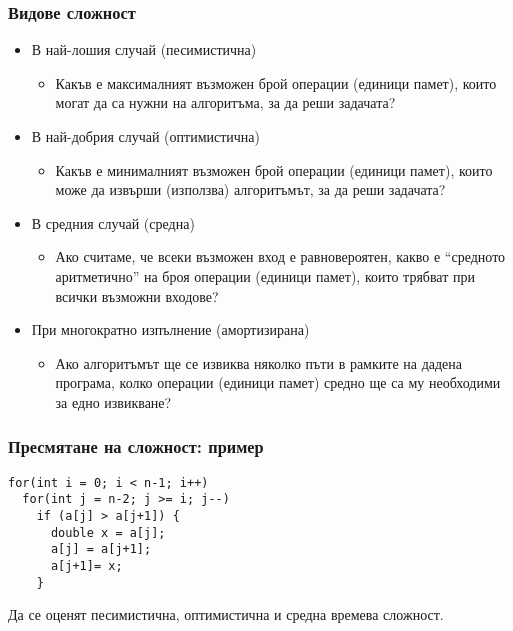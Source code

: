 \documentclass{beamer}
\begin{document}
\begin{frame}
  \frametitle{Видове сложност}

  \begin{itemize}[<+->]
  \item В най-лошия случай (песимистична)
    \begin{itemize}
    \item Какъв е максималният възможен брой операции (единици памет), които могат да са нужни на алгоритъма, за да реши задачата?
    \end{itemize}

  \item В най-добрия случай (оптимистична)
    \begin{itemize}
    \item Какъв е минималният възможен брой операции (единици памет), които може да извърши (използва) алгоритъмът, за да реши задачата?
    \end{itemize}

  \item В средния случай (средна)
    \begin{itemize}
    \item Ако считаме, че всеки възможен вход е равновероятен, какво е ``средното аритметично'' на броя операции (единици памет), които трябват при всички възможни входове?
    \end{itemize}

  \item При многократно изпълнение (амортизирана)
    \begin{itemize}
    \item Ако алгоритъмът ще се извиква няколко пъти в рамките на дадена програма, колко операции (единици памет) средно ще са му необходими за едно извикване?
    \end{itemize}
  \end{itemize}

\end{frame}

\begin{frame}[fragile]
  \frametitle{Пресмятане на сложност: пример}

\begin{verbatim}
for(int i = 0; i < n-1; i++)
  for(int j = n-2; j >= i; j--)
    if (a[j] > a[j+1]) {
      double x = a[j];
      a[j] = a[j+1];
      a[j+1]= x;
    }
\end{verbatim}

Да се оценят песимистична, оптимистична и средна времева сложност.
\end{frame}
\end{document}

